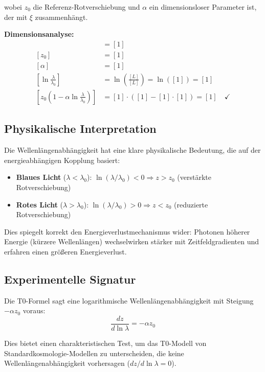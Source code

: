 \documentclass[12pt,a4paper]{report}
\begin{document}
	wobei $z_0$ die Referenz-Rotverschiebung und $\alpha$ ein dimensionsloser Parameter ist, der mit $\xi$ zusammenhängt.
	
	\textbf{Dimensionsanalyse:}
	\begin{align}
		[z(\lambda)] &= [1] \\
		[z_0] &= [1] \\
		[\alpha] &= [1] \\
		\left[\ln\frac{\lambda}{\lambda_0}\right] &= \ln\left(\frac{[L]}{[L]}\right) = \ln([1]) = [1] \\
		\left[z_0\left(1 - \alpha \ln\frac{\lambda}{\lambda_0}\right)\right] &= [1] \cdot ([1] - [1] \cdot [1]) = [1] \quad \checkmark
	\end{align}
	
	\subsection{Physikalische Interpretation}
	\label{subsec:physical_interpretation_redshift}
	
	Die Wellenlängenabhängigkeit hat eine klare physikalische Bedeutung, die auf der energieabhängigen Kopplung basiert:
	\begin{itemize}
		\item \textbf{Blaues Licht} ($\lambda < \lambda_0$): $\ln(\lambda/\lambda_0) < 0 \Rightarrow z > z_0$ (verstärkte Rotverschiebung)
		\item \textbf{Rotes Licht} ($\lambda > \lambda_0$): $\ln(\lambda/\lambda_0) > 0 \Rightarrow z < z_0$ (reduzierte Rotverschiebung)
	\end{itemize}
	
	Dies spiegelt korrekt den Energieverlustmechanismus wider: Photonen höherer Energie (kürzere Wellenlängen) wechselwirken stärker mit Zeitfeldgradienten und erfahren einen größeren Energieverlust.
	
	\subsection{Experimentelle Signatur}
	\label{subsec:experimental_signature}
	
	Die T0-Formel sagt eine logarithmische Wellenlängenabhängigkeit mit Steigung $-\alpha z_0$ voraus:
	\begin{equation}
		\frac{dz}{d\ln\lambda} = -\alpha z_0
	\end{equation}
	
	Dies bietet einen charakteristischen Test, um das T0-Modell von Standardkosmologie-Modellen zu unterscheiden, die keine Wellenlängenabhängigkeit vorhersagen ($dz/d\ln\lambda = 0$).
	
\end{document}
